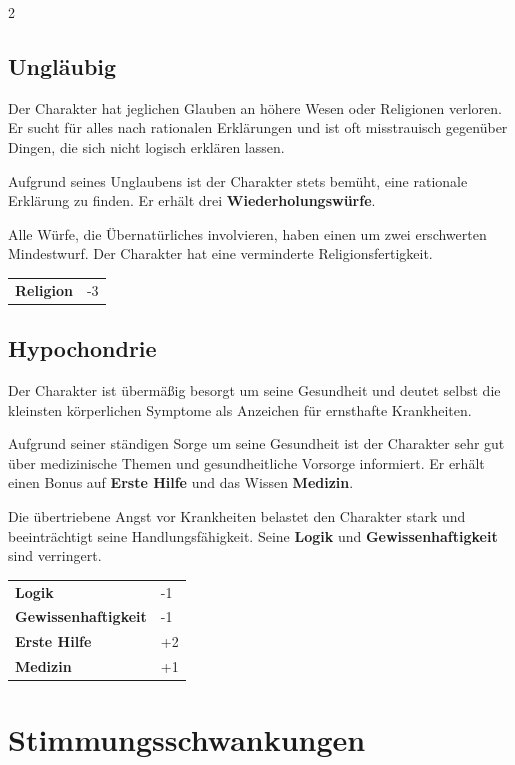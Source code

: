 \begin{multicols}{2}
    \subsection*{Ungläubig}

    Der Charakter hat jeglichen Glauben an höhere Wesen oder Religionen verloren. Er sucht für alles nach rationalen Erklärungen und ist oft misstrauisch gegenüber Dingen, die sich nicht logisch erklären lassen.

    Aufgrund seines Unglaubens ist der Charakter stets bemüht, eine rationale Erklärung zu finden. Er erhält drei \textbf{Wiederholungswürfe}.

    Alle Würfe, die Übernatürliches involvieren, haben einen um zwei erschwerten Mindestwurf. Der Charakter hat eine verminderte Religionsfertigkeit.

    \begin{tabular}{@{}ll@{}}
        \textbf{Religion} & -3\\
    \end{tabular}

    \subsection*{Hypochondrie}

    Der Charakter ist übermäßig besorgt um seine Gesundheit und deutet selbst die kleinsten körperlichen Symptome als Anzeichen für ernsthafte Krankheiten.

    Aufgrund seiner ständigen Sorge um seine Gesundheit ist der Charakter sehr gut über medizinische Themen und gesundheitliche Vorsorge informiert. Er erhält einen Bonus auf \textbf{Erste Hilfe} und das Wissen \textbf{Medizin}.

    Die übertriebene Angst vor Krankheiten belastet den Charakter stark und beeinträchtigt seine Handlungsfähigkeit. Seine \textbf{Logik} und \textbf{Gewissenhaftigkeit} sind verringert.

    \begin{tabular}{@{}ll@{}}
        \textbf{Logik} & -1\\
        \textbf{Gewissenhaftigkeit} & -1\\
        \textbf{Erste Hilfe} & +2\\
        \textbf{Medizin} & +1\\
    \end{tabular}

    \section{Stimmungsschwankungen}


\end{multicols}
